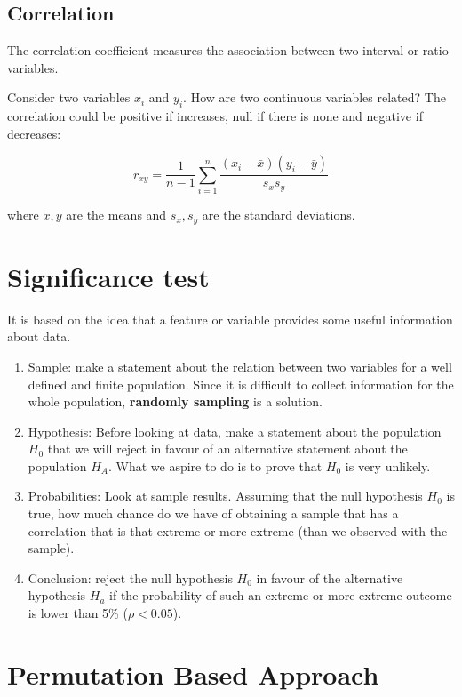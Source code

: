 \documentclass[
  notitlepage,
  onecolumn,
  openany]{book}
\providecommand{\tightlist}{%
  \setlength{\itemsep}{0pt}\setlength{\parskip}{0pt}}
\begin{document}
\hypertarget{correlation}{%
\subsection{Correlation}\label{correlation}}

The correlation coefficient measures the association between two interval or ratio variables.

Consider two variables \(x_i\) and \(y_i\). How are two continuous variables related? The correlation could be positive if increases, null if there is none and negative if decreases:

\[
r_{xy} = \frac{1}{n-1}\sum^n_{i=1} \frac{(x_i-\bar{x})(y_i-\bar{y})}{s_xs_y}
\]

where \(\bar{x}, \bar{y}\) are the means and \(s_x,s_y\) are the standard deviations.

\hypertarget{significance-test}{%
\section{Significance test}\label{significance-test}}

It is based on the idea that a feature or variable provides some useful information about data.

\begin{enumerate}
\def\labelenumi{\arabic{enumi}.}
\tightlist
\item
  Sample: make a statement about the relation between two variables for a well defined and finite population. Since it is difficult to collect information for the whole population, \textbf{randomly sampling} is a solution.
\item
  Hypothesis: Before looking at data, make a statement about the population \(H_0\) that we will reject in favour of an alternative statement about the population \(H_A\). What we aspire to do is to prove that \(H_0\) is very unlikely.
\item
  Probabilities: Look at sample results. Assuming that the null hypothesis \(H_0\) is true, how much chance do we have of obtaining a sample that has a correlation that is that extreme or more extreme (than we observed with the sample).
\item
  Conclusion: reject the null hypothesis \(H_0\) in favour of the alternative hypothesis \(H_a\) if the probability of such an extreme or more extreme outcome is lower than 5\% (\(\rho<0.05\)).
\end{enumerate}

\hypertarget{permutation-based-approach}{%
\section{Permutation Based Approach}\label{permutation-based-approach}}
\end{document}
